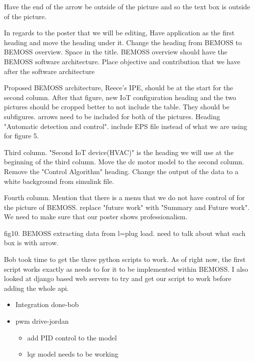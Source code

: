 \documentclass[fontsize=11pt, %
                             paper=letter, %
                             twoside, %
                             captions=tableheading,
                             index=totoc,
                             hyperref]{labbook}
\begin{document}
Have the end of the arrow be outside of the picture and so the text box is outside of the picture.

In regards to the poster that we will be editing, Have application as the first heading and move the heading under it. Change the heading from BEMOSS to BEMOSS overview. Space in the title. BEMOSS overview should have the BEMOSS software architecture. Place objective and contribution that we have after the software architecture

Proposed BEMOSS architecture, Reece's IPE,  should be at the start for the second column. After that figure, new IoT configuration heading and the two pictures should be cropped better to not include the table. They should be subfigures. arrows need to be included for both of the pictures. Heading "Automatic detection and control". include EPS file instead of what we are using for figure 5.

Third column. "Second IoT device(HVAC)" is the heading we will use at the beginning of the third column. Move the dc motor model to the second column. Remove the "Control Algorithm" heading. Change the output of the data to a white background from simulink file. 

Fourth column. Mention that there is a menu that we do not have control of for the picture of BEMOSS. replace "future work" with "Summary and Future work". We need to make sure that our poster shows professionalism.


fig10. BEMOSS extracting data from l=plug load. need to talk about what each box is with arrow.


Bob took time to get the three python scripts to work. As of right now, the first script works exactly as needs to for it to be implemented within BEMOSS. I also looked at django based web servers to try and get our script to work before adding the whole api.



\begin{itemize}
\item  Integration done-bob
\item pwm drive-jordan 
  \begin{itemize}
  \item add PID control to the model 
  \item lqr model needs to be working 
  \end{itemize}
\end{itemize}
\end{document}
